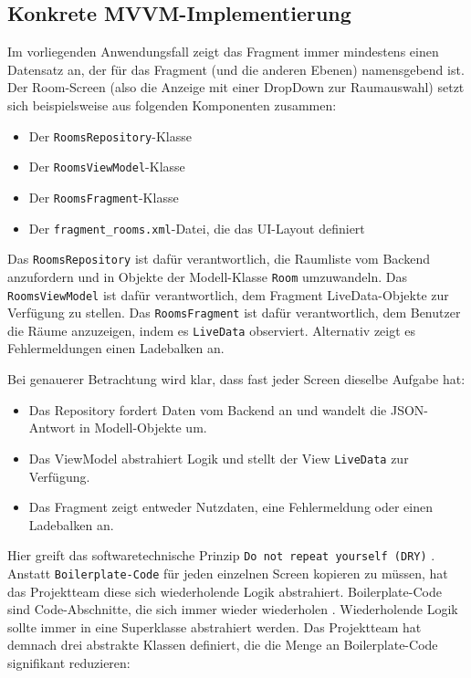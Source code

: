\hypertarget{konkrete-mvvm-implementierung}{%
\subsection{Konkrete
MVVM-Implementierung}\label{konkrete-mvvm-implementierung}}

Im vorliegenden Anwendungsfall zeigt das Fragment immer mindestens einen
Datensatz an, der für das Fragment (und die anderen Ebenen) namensgebend
ist. Der Room-Screen (also die Anzeige mit einer DropDown zur
Raumauswahl) setzt sich beispielsweise aus folgenden Komponenten
zusammen:

\begin{itemize}
\tightlist
\item
  Der \texttt{RoomsRepository}-Klasse
\item
  Der \texttt{RoomsViewModel}-Klasse
\item
  Der \texttt{RoomsFragment}-Klasse
\item
  Der \texttt{fragment\_rooms.xml}-Datei, die das UI-Layout definiert
\end{itemize}

Das \texttt{RoomsRepository} ist dafür verantwortlich, die Raumliste vom
Backend anzufordern und in Objekte der Modell-Klasse \texttt{Room}
umzuwandeln. Das \texttt{RoomsViewModel} ist dafür verantwortlich, dem
Fragment LiveData-Objekte zur Verfügung zu stellen. Das
\texttt{RoomsFragment} ist dafür verantwortlich, dem Benutzer die Räume
anzuzeigen, indem es \texttt{LiveData} observiert. Alternativ zeigt es
Fehlermeldungen \bzw einen Ladebalken an.

Bei genauerer Betrachtung wird klar, dass fast jeder Screen dieselbe
Aufgabe hat:

\begin{itemize}
\tightlist
\item
  Das Repository fordert Daten vom Backend an und wandelt die
  JSON-Antwort in Modell-Objekte um.
\item
  Das ViewModel abstrahiert Logik und stellt der View \texttt{LiveData}
  zur Verfügung.
\item
  Das Fragment zeigt entweder Nutzdaten, eine Fehlermeldung oder einen
  Ladebalken an.
\end{itemize}

Hier greift das softwaretechnische Prinzip
\texttt{Do\ not\ repeat\ yourself\ (DRY)} \cite{dry}. Anstatt
\texttt{Boilerplate-Code} für jeden einzelnen Screen kopieren zu müssen,
hat das Projektteam diese sich wiederholende Logik abstrahiert.
Boilerplate-Code sind Code-Abschnitte, die sich immer wieder wiederholen
\cite{boiler}. Wiederholende Logik sollte immer in eine Superklasse
abstrahiert werden. Das Projektteam hat demnach drei abstrakte Klassen
definiert, die die Menge an Boilerplate-Code signifikant reduzieren:

